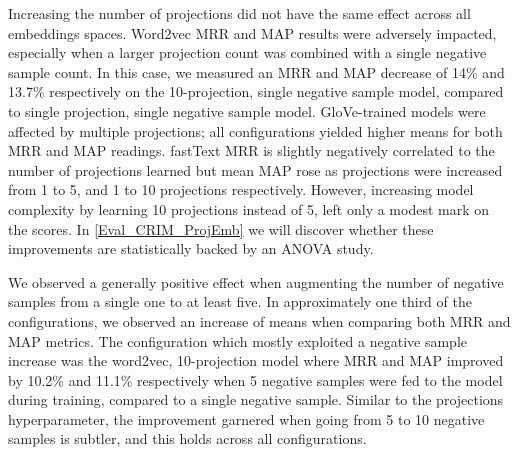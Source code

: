Increasing the number of projections did not have the same effect across all embeddings spaces.  Word2vec \ac{MRR} and \ac{MAP} results were adversely impacted, especially when a larger projection count was combined with a single negative sample count.  In this case, we measured an MRR and MAP decrease of 14\% and 13.7\% respectively on the 10-projection, single negative sample model, compared to single projection, single negative sample model.  GloVe-trained models were affected by multiple projections; all configurations yielded higher means for both \ac{MRR} and \ac{MAP} readings.  fastText \ac{MRR} is slightly negatively correlated to the number of projections learned but mean \ac{MAP} rose as projections were increased from 1 to 5, and 1 to 10 projections respectively.  However, increasing model complexity by learning 10 projections instead of 5, left only a modest mark on the scores.  In \cref{Eval_CRIM_ProjEmb} we will discover whether these improvements are statistically backed by an \ac{ANOVA} study.

We observed a generally positive effect when augmenting the number of negative samples from a single one to at least five.  In approximately one third of the configurations, we observed an increase of means when  comparing both \ac{MRR} and \ac{MAP} metrics.  The configuration which mostly exploited a negative sample increase was the word2vec, 10-projection model where \ac{MRR} and \ac{MAP} improved by 10.2\% and 11.1\% respectively when 5 negative samples were fed to the model during training, compared to a single negative sample.  Similar to the projections hyperparameter, the improvement garnered when going from 5 to 10 negative samples is subtler, and this holds across all configurations.  

